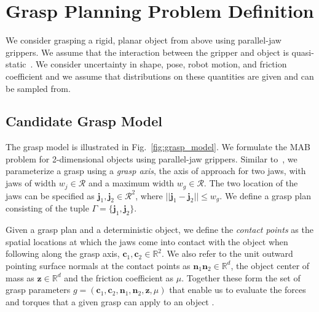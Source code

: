 \documentclass[10pt, conference]{ieeeconf}      %
\newcommand{\bc}{\mathbf{c}}
\newcommand{\bn}{\mathbf{n}}
\newcommand{\bz}{\mathbf{z}}
\begin{document}
\section{Grasp Planning Problem Definition}
We consider grasping a rigid, planar object from above using parallel-jaw grippers.
We assume that the interaction between the gripper and object is quasi-static~\cite{kehoe2012estimating, kehoe2012toward}.
We consider uncertainty in shape, pose, robot motion, and friction coefficient and we assume that distributions on these quantities are given and can be sampled from. 



\subsection{Candidate Grasp Model}
The grasp model is illustrated in Fig.~\ref{fig:grasp_model}. We formulate the MAB problem for 2-dimensional objects using parallel-jaw grippers. Similar to~\cite{mahler2015gp}, we parameterize a grasp using a {\it grasp axis}, the axis of approach for two jaws,  with jaws of width $w_j \in \mathcal{R}$ and a maximum width $w_g \in \mathcal{R}$. The two location of the jaws can be specified as $\mathbf{j}_1,\mathbf{j}_2 \in \mathcal{R}^2$, where $||\mathbf{j}_1 - \mathbf{j}_2|| \leq w_g$. We define a grasp plan consisting of the tuple $\Gamma = \lbrace \mathbf{j}_1, \mathbf{j}_2 \rbrace$. 

Given a grasp plan and a deterministic object, we define the {\it contact points} as the spatial locations at which the jaws come into contact with the object when following along the grasp axis, $\bc_1, \bc_2 \in \mathbb{R}^2$.
We also refer to the unit outward pointing surface normals at the contact points as $\bn_1 \bn_2 \in \mathbb{R}^d$, the object center of mass as $\bz \in \mathbb{R}^d$ and the friction coefficient as $\mu$.
Together these form the set of grasp parameters $g = (\bc_1,\bc_2, \bn_1, \bn_2, \bz,\mu)$ that enable us to evaluate the forces and torques that a given grasp can apply to an object \cite{ferrari1992}. 
\end{document}
